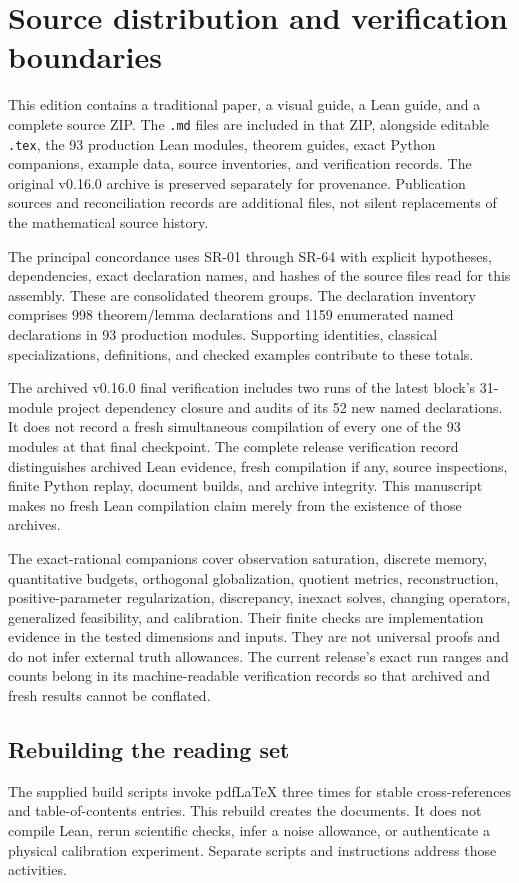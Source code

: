 \documentclass[11pt]{article}
\theoremstyle{definition}\newtheorem{definition}[theorem]{Definition}
\theoremstyle{remark}\newtheorem{remark}[theorem]{Remark}
\begin{document}
\section{Source distribution and verification boundaries}

This edition contains a traditional paper, a visual guide, a Lean guide,
and a complete source ZIP. The \texttt{.md} files are included in that ZIP,
alongside editable \texttt{.tex}, the 93 production Lean modules, theorem
guides, exact Python companions, example data, source inventories, and
verification records. The original v0.16.0 archive is preserved separately
for provenance. Publication sources and reconciliation records are
additional files, not silent replacements of the mathematical source history.

The principal concordance uses SR-01 through SR-64 with explicit hypotheses,
dependencies, exact declaration names, and hashes of the source files read
for this assembly. These are consolidated theorem groups. The declaration
inventory comprises 998 theorem/lemma declarations and 1159 enumerated
named declarations in 93 production modules. Supporting identities,
classical specializations, definitions, and checked examples contribute
to these totals.

The archived v0.16.0 final verification includes two runs of the latest
block's 31-module project dependency closure and audits of its 52 new
named declarations. It does not record a fresh simultaneous compilation
of every one of the 93 modules at that final checkpoint. The complete
release verification record distinguishes archived Lean evidence,
fresh compilation if any, source inspections, finite Python replay,
document builds, and archive integrity. This manuscript makes no fresh
Lean compilation claim merely from the existence of those archives.

The exact-rational companions cover observation saturation, discrete
memory, quantitative budgets, orthogonal globalization, quotient metrics,
reconstruction, positive-parameter regularization, discrepancy,
inexact solves, changing operators, generalized feasibility, and calibration.
Their finite checks are implementation evidence in the tested dimensions
and inputs. They are not universal proofs and do not infer external truth
allowances. The current release's exact run ranges and counts belong in
its machine-readable verification records so that archived and fresh
results cannot be conflated.

\subsection{Rebuilding the reading set}
The supplied build scripts invoke pdfLaTeX three times for stable
cross-references and table-of-contents entries. This rebuild creates the
documents. It does not compile Lean, rerun scientific checks, infer a
noise allowance, or authenticate a physical calibration experiment.
Separate scripts and instructions address those activities.
\end{document}
